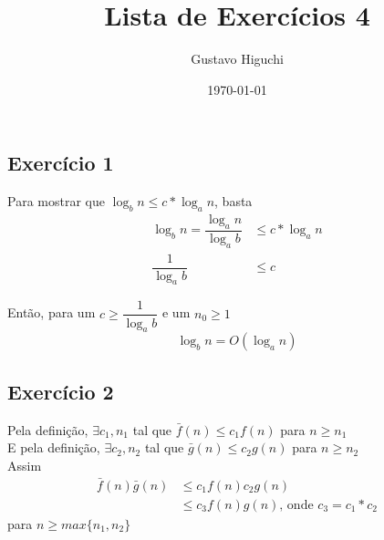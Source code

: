 \documentclass{article}
\title{Lista de Exercícios 4}
\author{Gustavo Higuchi}
\date{\today}
\begin{document}
\maketitle

\tableofcontents
\newpage


\chapter{}

\section{Exercício 1}
Para mostrar que $\log_b n \leq c * \log_a n$, basta
\begin{equation}
    \begin{split}
    \log_b n  = \dfrac{\log_a n}{\log_a b} & \leq c*\log_a n\\
    \dfrac{1}{\log_a b} & \leq c
    \end{split}
\end{equation}

Então, para um $c \geq \dfrac{1}{\log_a b}$ e um $n_0 \geq 1$
\begin{equation}
    \log_b n = O(\log_a n)
\end{equation}

\section{Exercício 2}
Pela definição, $\exists c_1, n_1$ tal que $\bar{f}(n) \leq c_1f(n)$
para $n \geq n_1$\\
E pela definição, $\exists c_2, n_2$ tal que $\bar{g}(n) \leq c_2g(n)$
para $n \geq n_2$\\
Assim\\
\begin{equation}
    \begin{split}
        \bar{f}(n)\bar{g}(n) &\leq c_1f(n)c_2g(n)\\
        &\leq c_3f(n)g(n)\text{, onde }c_3 = c_1 * c_2
    \end{split}
\end{equation}
para $n \geq max\{n_1,n_2\}$
\end{document}
